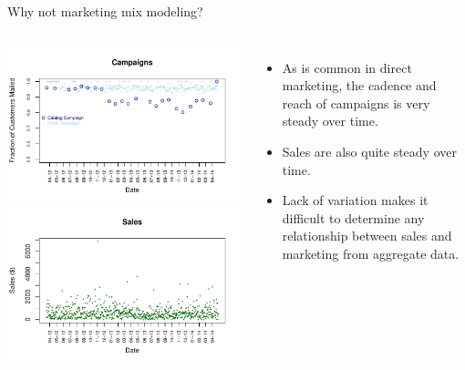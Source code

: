 \documentclass[10pt, aspectratio=169]{beamer}
\begin{document}
\begin{frame}{Why not marketing mix modeling?}
\begin{columns}[T]
\includegraphics[height=0.5\textheight]{images/campaigns_by_day.pdf} \\
\includegraphics[height=0.5\textheight]{images/sales_by_day.pdf}
\begin{itemize}
\item As is common in direct marketing, the cadence and reach of campaigns is very steady over time. 
\item Sales are also quite steady over time. 
\item Lack of variation makes it difficult to determine any relationship between sales and marketing from aggregate data.
\end{itemize}
\end{columns}
\end{frame}
\end{document}
